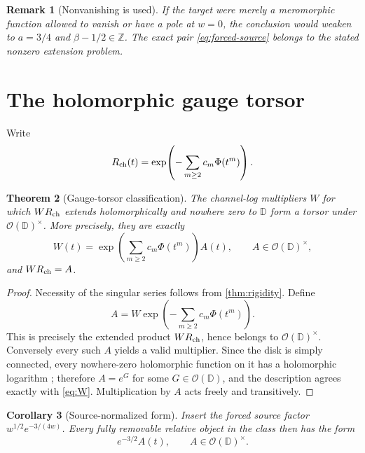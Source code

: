 \documentclass[11pt]{article}
\newtheorem{theorem}{Theorem}[section]
\newtheorem{corollary}[theorem]{Corollary}
\newtheorem{remark}[theorem]{Remark}
\newcommand{\D}{\mathbb D}
\newcommand{\Ohol}{\mathcal O}
\begin{document}
\begin{remark}[Nonvanishing is used]
If the target were merely a meromorphic function allowed to vanish or have a
pole at \(w=0\), the conclusion would weaken to
\(a=3/4\) and \(\beta-1/2\in\mathbb Z\).  The exact pair
\cref{eq:forced-source} belongs to the stated nonzero extension problem.
\end{remark}

\section{The holomorphic gauge torsor}

Write
\begin{equation}\label{eq:Rch}
 R_{\rm ch}(t)=\exp\!\left(-\sum_{m\ge2}c_m\Phi(t^m)\right).
\end{equation}

\begin{theorem}[Gauge-torsor classification]\label{thm:gauge}
The channel-log multipliers \(W\) for which \(WR_{\rm ch}\) extends
holomorphically and nowhere zero to \(\D\) form a torsor under
\(\Ohol(\D)^\times\).  More precisely, they are exactly
\begin{equation}\label{eq:gauge-form}
 W(t)=\exp\!\left(\sum_{m\ge2}c_m\Phi(t^m)\right)A(t),
 \qquad A\in\Ohol(\D)^\times,
\end{equation}
and \(WR_{\rm ch}=A\).
\end{theorem}

\begin{proof}
Necessity of the singular series follows from \cref{thm:rigidity}.  Define
\[
 A=W\exp\!\left(-\sum_{m\ge2}c_m\Phi(t^m)\right).
\]
This is precisely the extended product \(WR_{\rm ch}\), hence belongs to
\(\Ohol(\D)^\times\).  Conversely every
such \(A\) yields a valid multiplier.  Since the disk is simply connected,
every nowhere-zero holomorphic function on it has a holomorphic logarithm
\cite{Conway1978}; therefore \(A=e^G\) for some \(G\in\Ohol(\D)\), and the
description agrees exactly with \cref{eq:W}.  Multiplication by \(A\) acts
freely and transitively.
\end{proof}

\begin{corollary}[Source-normalized form]\label{cor:full-gauge}
Insert the forced source factor \(w^{1/2}e^{-3/(4w)}\).  Every fully
removable relative object in the class then
has the form
\begin{equation}\label{eq:full-gauge}
 e^{-3/2}A(t),\qquad A\in\Ohol(\D)^\times.
\end{equation}
\end{corollary}
\end{document}
